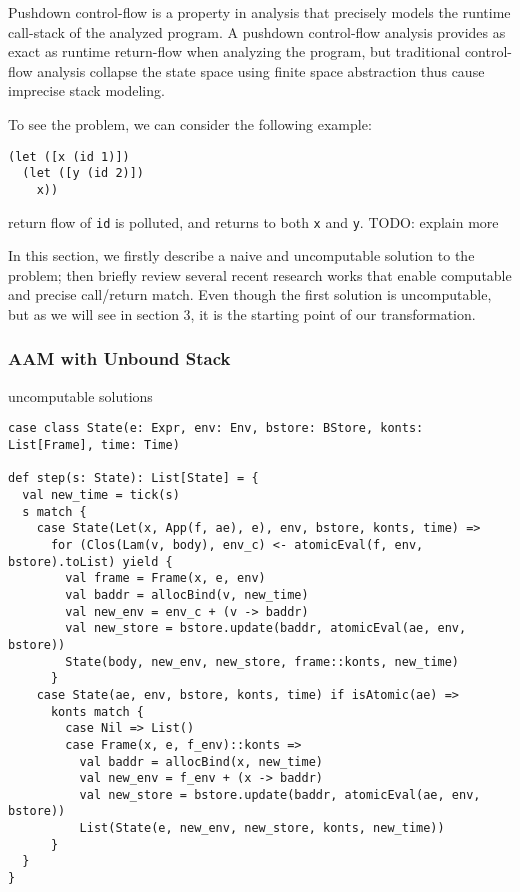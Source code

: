\documentclass[acmsmall,review,anonymous]{acmart}\settopmatter{printfolios=true,printccs=false,printacmref=false}
\begin{document}
Pushdown control-flow is a property in analysis that precisely models
the runtime call-stack of the analyzed program. 
A pushdown control-flow analysis provides as exact as runtime return-flow 
when analyzing the program, but traditional control-flow analysis collapse 
the state space using finite space abstraction thus cause imprecise stack modeling.

To see the problem, we can consider the following example:

\begin{verbatim}
(let ([x (id 1)])
  (let ([y (id 2)])
    x))
\end{verbatim}

return flow of \texttt{id} is polluted, and returns to both \texttt{x} and
\texttt{y}. TODO: explain more

In this section, we firstly describe a naive and uncomputable solution to the
problem; then briefly review several recent research works that enable
computable and precise call/return match. Even though the first solution is
uncomputable, but as we will see in section 3, it is the starting point of our
transformation. 

\subsubsection{AAM with Unbound Stack}

uncomputable solutions

\begin{verbatim}
case class State(e: Expr, env: Env, bstore: BStore, konts: List[Frame], time: Time)

def step(s: State): List[State] = {
  val new_time = tick(s)
  s match {
    case State(Let(x, App(f, ae), e), env, bstore, konts, time) =>
      for (Clos(Lam(v, body), env_c) <- atomicEval(f, env, bstore).toList) yield {
        val frame = Frame(x, e, env)
        val baddr = allocBind(v, new_time)
        val new_env = env_c + (v -> baddr)
        val new_store = bstore.update(baddr, atomicEval(ae, env, bstore))
        State(body, new_env, new_store, frame::konts, new_time)
      }
    case State(ae, env, bstore, konts, time) if isAtomic(ae) =>
      konts match {
        case Nil => List()
        case Frame(x, e, f_env)::konts =>
          val baddr = allocBind(x, new_time)
          val new_env = f_env + (x -> baddr)
          val new_store = bstore.update(baddr, atomicEval(ae, env, bstore))
          List(State(e, new_env, new_store, konts, new_time))
      }
  }
}
\end{verbatim}
\end{document}
